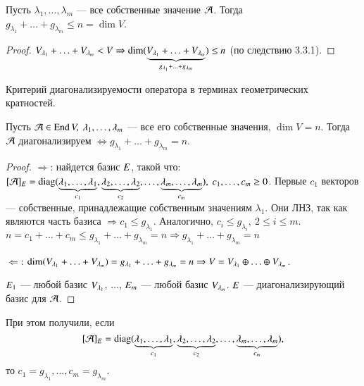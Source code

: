 \documentclass[main]{subfiles}
\begin{document}
\begin{corollary}
    Пусть $\lambda_1, \ldots, \lambda_m$ — все собственные значение $\mathcal{A}$.
    Тогда $g_{\lambda_1} + \ldots + g_{\lambda_m} \le n = \dim V$.
\end{corollary}

\begin{proof}
    $V_{\lambda_1} + \ldots + V_{\lambda_m} < V
        \Rightarrow \dim (\underbrace{V_{\lambda_1} + \ldots + V_{\lambda_m}}_{g_{\lambda_1} + \ldots + g_{\lambda_m}}) \leq n$ (по следствию 3.3.1).
\end{proof}

\begin{proposition}
    Критерий диагонализируемости оператора в терминах геометрических кратностей.

    Пусть $\mathcal{A} \in \operatorname{End} V,\ \lambda_1, \ldots, \lambda_m$  — все его собственные значения,
    $\dim V = n$. Тогда $\mathcal{A}$  диагонализируем $\Leftrightarrow
        g_{\lambda_1} + \ldots +  g_{\lambda_m} = n$.
\end{proposition}

\begin{proof}
    $\Rightarrow$: найдется базис $E$, такой что:
    $[\mathcal{A}]_E = \operatorname{diag}(\underbrace{\lambda_1, \ldots, \lambda_1}_{c_1},
        \underbrace{\lambda_2, \ldots, \lambda_2}_{c_2}, \ldots,
        \underbrace{\lambda_m, \ldots, \lambda_m}_{c_m}), \  c_1, \ldots, c_m \geq 0$.
    Первые $c_1$  векторов  — собственные, принадлежащие собственным значениям
    $\lambda_1$. Они ЛНЗ, так как являются часть базиса $\Rightarrow c_1 \leq g_{\lambda_1}$.
    Аналогично, $c_i \leq g_{\lambda_i},\ 2 \leq i \leq m$.
    $n = c_1 + \ldots + c_m \leq g_{\lambda_1} + \ldots + g_{\lambda_m} = n
        \Rightarrow g_{\lambda_1} + \ldots + g_{\lambda_m} = n$

    $\Leftarrow$: $\dim (V_{\lambda_1} + \ldots + V_{\lambda_m}) =
        g_{\lambda_1} + \ldots + g_{\lambda_m} = n \Rightarrow
        V = V_{\lambda_1} \oplus \ldots \oplus  V_{\lambda_m}$.

    $E_1$  — любой базис $V_{\lambda_1}$, $\ldots$,
    $E_m$  — любой базис $V_{\lambda_m}$.
    $E$  — диагонализирующий базис для $\mathcal{A}$.
\end{proof}

\begin{remark}
    При этом получили, если
    \[[\mathcal{A}]_E = \operatorname{diag}(\underbrace{\lambda_1, \ldots, \lambda_1}_{c_1},
        \underbrace{\lambda_2, \ldots, \lambda_2}_{c_2}, \ldots,
        \underbrace{\lambda_m, \ldots, \lambda_m}_{c_m}),\]
    то $c_1 = g_{\lambda_1}, \ldots,c_m = g_{\lambda_m}$.
\end{remark}
\end{document}
